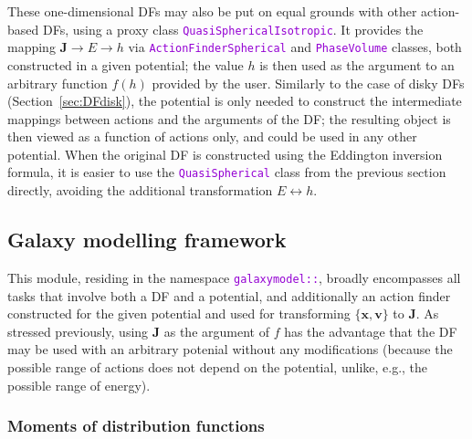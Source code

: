 \documentclass[12pt]{article}
\newcommand{\ttt}[1]{\textcolor{darkviolet}{\texttt{#1}}}
\newcommand{\bv}{\boldsymbol{v}}
\newcommand{\bx}{\boldsymbol{x}}
\newcommand{\bJ}{\boldsymbol{J}}
\begin{document}
These one-dimensional DFs may also be put on equal grounds with other action-based DFs, using a proxy class \ttt{QuasiSphericalIsotropic}. It provides the mapping $\bJ \to E \to h$ via \ttt{ActionFinderSpherical} and \ttt{PhaseVolume} classes, both constructed in a given potential; the value $h$ is then used as the argument to an arbitrary function $f(h)$ provided by the user. Similarly to the case of disky DFs (Section~\ref{sec:DFdisk}), the potential is only needed to construct the intermediate mappings between actions and the arguments of the DF; the resulting object is then viewed as a function of actions only, and could be used in any other potential.
When the original DF is constructed using the Eddington inversion formula, it is easier to use the \ttt{QuasiSpherical} class from the previous section directly, avoiding the additional transformation $E\leftrightarrow h$.


\subsection{Galaxy modelling framework}  \label{sec:GalaxyModel}

This module, residing in the namespace \ttt{galaxymodel::}, broadly encompasses all tasks that involve both a DF and a potential, and additionally an action finder constructed for the given potential and used for transforming $\{\bx,\bv\}$ to $\bJ$.
As stressed previously, using $\bJ$ as the argument of $f$ has the advantage that the DF may be used with an arbitrary potenial without any modifications (because the possible range of actions does not depend on the potential, unlike, e.g., the possible range of energy).


\subsubsection{Moments of distribution functions}  \label{sec:Moments}
\end{document}
